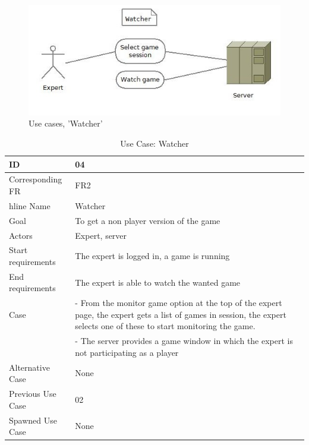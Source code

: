 \begin{figure}[H]
  \centering
    \includegraphics[width=1.0\textwidth]{img/watcher.jpg}
  \caption{Use cases, 'Watcher'} 
  \label{fig:watcher}
\end{figure}


\begin{table}[H]
\begin{tabular}{|l|p{14cm}|}
\hline
	\textbf{ID} & \textbf{04}\\ \hline
	Corresponding FR & FR2\\hline
	Name & Watcher\\ \hline
	Goal & To get a non player version of the game\\ \hline
	Actors & Expert, server\\ \hline
	Start requirements & The expert is logged in, a game is running \\ \hline
	End requirements & The expert is able to watch the wanted game\\ \hline
	Case & - From the monitor game option at the top of the expert page, the expert gets a list of games in session, the expert selects one of these to start monitoring the game.\\
		 & - The server provides a game window in which the expert is not participating as a player\\ \hline
	Alternative Case & None \\ \hline
	Previous Use Case & 02\\ \hline
	Spawned Use Case & None\\ \hline
\end{tabular}
\caption{Use Case: Watcher}
\label{fig:usecase04table}
\end{table}


